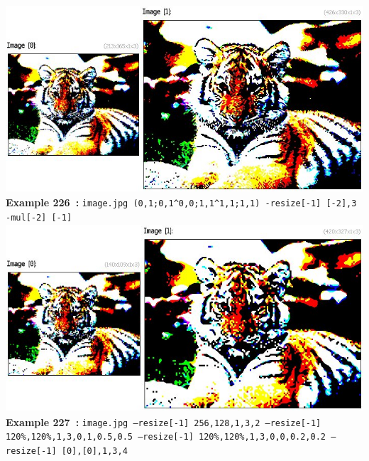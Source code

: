 \documentclass[a4paper,11pt,twoside]{book}
\begin{document}
\begin{center}\includegraphics[keepaspectratio=true,height=7cm,width=\textwidth]{img/gmic_def226.jpg}\\
{\footnotesize \textbf{Example 226~:} \texttt{image.jpg (0,1;0,1\textasciicircum 0,0;1,1\textasciicircum 1,1;1,1) -resize[-1] [-2],3 -mul[-2] [-1]}}
\\\includegraphics[keepaspectratio=true,height=7cm,width=\textwidth]{img/gmic_def227.jpg}\\
{\footnotesize \textbf{Example 227~:} \texttt{image.jpg --resize[-1] 256,128,1,3,2 --resize[-1] 120\%,120\%,1,3,0,1,0.5,0.5 --resize[-1] 120\%,120\%,1,3,0,0,0.2,0.2 --resize[-1] [0],[0],1,3,4}}
\end{center}
\end{document}
